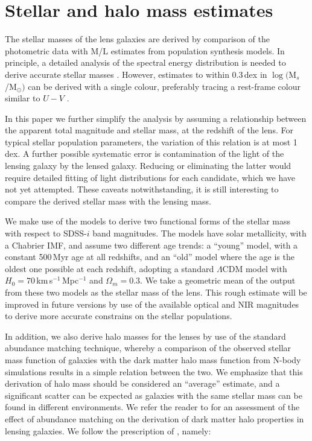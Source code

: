 \section{Stellar and halo mass estimates}\label{sec:stellar-mass}

The stellar masses of the lens galaxies are derived by comparison of
the photometric data with M/L estimates from population synthesis
models.  In principle, a detailed analysis of the spectral energy
distribution is needed to derive accurate stellar masses
\citep[e.g.][]{2009ApJS..185..253G,2011MNRAS.418.1587T}.  However,
estimates to within 0.3\,dex in $\log($M$_s$/M$_\odot)$ can be derived
with a single colour, preferably tracing a rest-frame colour similar
to $U-V$ \citep[see fig.~1 of][]{2008MNRAS.383..857F}. 

In this paper we further simplify the analysis by assuming a
relationship between the apparent total magnitude and stellar mass, at
the redshift of the lens.  For typical stellar population parameters,
the variation of this relation is at most 1\,dex.  A further possible
systematic error is contamination of the light of the lensing galaxy
by the lensed galaxy.  Reducing or eliminating the latter would
require detailed fitting of light distributions for each candidate,
which we have not yet attempted.  These caveats notwithstanding, it is
still interesting to compare the derived stellar mass with the lensing
mass.

We make use of the \citet{2003MNRAS.344.1000B} models to derive two
functional forms of the stellar mass with respect to SDSS-$i$ band
magnitudes. The models have solar metallicity, with a Chabrier IMF,
and assume two different age trends: a ``young'' model, with a
constant 500\,Myr age at all redshifts, and an ``old'' model where the
age is the oldest one possible at each redshift, adopting a standard
$\Lambda$CDM model with $H_0=70$\,km\,s$^{-1}$\,Mpc$^{-1}$ and
$\Omega_m=0.3$. We take a geometric mean of the output from these two
models as the stellar mass of the lens. This rough estimate will be
improved in future versions by use of the available optical and NIR
magnitudes to derive more accurate constrains on the stellar
populations.

In addition, we also derive halo masses for the lenses by use of the
standard abundance matching technique, whereby a comparison of the
observed stellar mass function of galaxies with the dark matter halo
mass function from N-body simulations results in a simple relation
between the two. We emphasize that this derivation of halo mass should
be considered an ``average'' estimate, and a significant scatter can
be expected as galaxies with the same stellar mass can be found in
different environments. We refer the reader to \cite{2012MNRAS.424..104L}
for an assessment of the effect of abundance matching on the
derivation of dark matter halo properties in lensing galaxies. We
follow the prescription of \citet{2010ApJ...710..903M}, namely:

